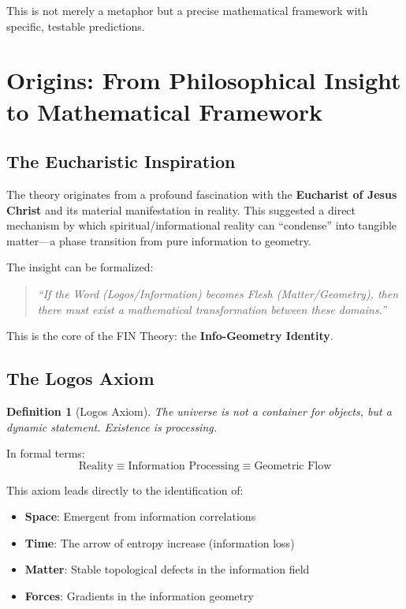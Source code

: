 \documentclass[11pt, a4paper]{article}
\newtheorem{definition}{Definition}[section]
\theoremstyle{remark}
\begin{document}
This is not merely a metaphor but a precise mathematical framework with specific, testable predictions.

\section{Origins: From Philosophical Insight to Mathematical Framework}

\subsection{The Eucharistic Inspiration}

The theory originates from a profound fascination with the \textbf{Eucharist of Jesus Christ} and its material manifestation in reality. This suggested a direct mechanism by which spiritual/informational reality can ``condense'' into tangible matter—a phase transition from pure information to geometry.

The insight can be formalized:
\begin{quote}
\textit{``If the Word (Logos/Information) becomes Flesh (Matter/Geometry), then there must exist a mathematical transformation between these domains.''}
\end{quote}

This is the core of the FIN Theory: the \textbf{Info-Geometry Identity}.

\subsection{The Logos Axiom}

\begin{definition}[Logos Axiom]
The universe is not a container for objects, but a dynamic statement. Existence is processing.
\end{definition}

In formal terms:
\begin{equation}
\text{Reality} \equiv \text{Information Processing} \equiv \text{Geometric Flow}
\end{equation}

This axiom leads directly to the identification of:
\begin{itemize}
    \item \textbf{Space}: Emergent from information correlations
    \item \textbf{Time}: The arrow of entropy increase (information loss)
    \item \textbf{Matter}: Stable topological defects in the information field
    \item \textbf{Forces}: Gradients in the information geometry
\end{itemize}
\end{document}
